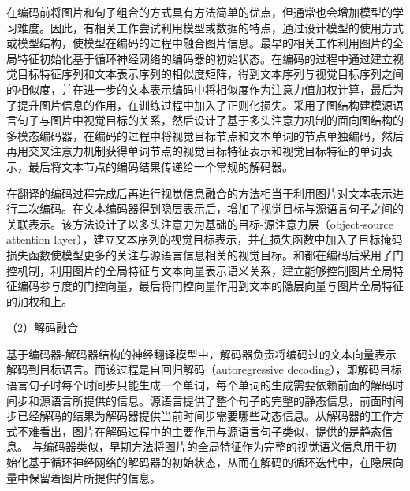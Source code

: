 在编码前将图片和句子组合的方式具有方法简单的优点，但通常也会增加模型的学习难度。因此，有相关工作尝试利用模型或数据的特点，通过设计模型的使用方式或模型结构，使模型在编码的过程中融合图片信息。最早的相关工作利用图片的全局特征初始化基于循环神经网络的编码器的初始状态。在编码的过程中通过建立视觉目标特征序列和文本表示序列的相似度矩阵，得到文本序列与视觉目标序列之间的相似度，并在进一步的文本表示编码中将相似度作为注意力值加权计算，最后为了提升图片信息的作用，在训练过程中加入了正则化损失。采用了图结构建模源语言句子与图片中视觉目标的关系，然后设计了基于多头注意力机制的面向图结构的多模态编码器，在编码的过程中将视觉目标节点和文本单词的节点单独编码，然后再用交叉注意力机制获得单词节点的视觉目标特征表示和视觉目标特征的单词表示，最后将文本节点的编码结果传递给一个常规的解码器。

在翻译的编码过程完成后再进行视觉信息融合的方法相当于利用图片对文本表示进行二次编码。在文本编码器得到隐层表示后，增加了视觉目标与源语言句子之间的关联表示。该方法设计了以多头注意力为基础的目标-源注意力层（object-source attention layer），建立文本序列的视觉目标表示，并在损失函数中加入了目标掩码损失函数使模型更多的关注与源语言信息相关的视觉目标。和都在编码后采用了门控机制，利用图片的全局特征与文本向量表示语义关系，建立能够控制图片全局特征编码参与度的门控向量，最后将门控向量作用到文本的隐层向量与图片全局特征的加权和上。

{\sffamily （2）解码融合}

基于编码器-解码器结构的神经翻译模型中，解码器负责将编码过的文本向量表示解码到目标语言。而该过程是自回归解码（autoregressive decoding），即解码目标语言句子时每个时间步只能生成一个单词，每个单词的生成需要依赖前面的解码时间步和源语言所提供的信息。源语言提供了整个句子的完整的静态信息，前面时间步已经解码的结果为解码器提供当前时间步需要哪些动态信息。从解码器的工作方式不难看出，图片在解码过程中的主要作用与源语言句子类似，提供的是静态信息。
与编码器类似，早期方法将图片的全局特征作为完整的视觉语义信息用于初始化基于循环神经网络的解码器的初始状态，从而在解码的循环迭代中，在隐层向量中保留着图片所提供的信息。

